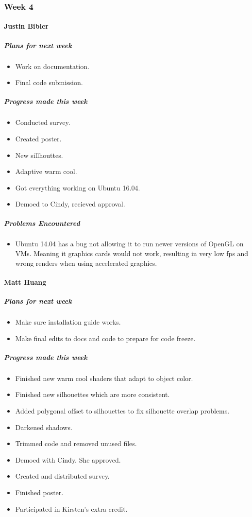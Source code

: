 {
\subsubsection{Week 4}
\paragraph{Justin Bibler}
\subparagraph{Plans for next week}
\begin{itemize}
  \item Work on documentation.
  \item Final code submission.
\end{itemize}

\subparagraph{Progress made this week}
\begin{itemize}
  \item Conducted survey.
  \item Created poster.
  \item New sillhouttes.
  \item Adaptive warm cool.
  \item Got everything working on Ubuntu 16.04.
  \item Demoed to Cindy, recieved approval.
\end{itemize}

\subparagraph{Problems Encountered}
\begin{itemize}
  \item Ubuntu 14.04 has a bug not allowing it to run newer versions of OpenGL on VMs. Meaning it graphics cards would not work, resulting in very low fps and wrong renders when using accelerated graphics.
\end{itemize}
\vspace{3mm}

\paragraph{Matt Huang}
\subparagraph{Plans for next week}
\begin{itemize}
  \item Make sure installation guide works.
  \item Make final edits to docs and code to prepare for code freeze.
\end{itemize}

\subparagraph{Progress made this week}
\begin{itemize}
  \item Finished new warm cool shaders that adapt to object color.
  \item Finished new silhouettes which are more consistent.
  \item Added polygonal offset to silhouettes to fix silhouette overlap problems.
  \item Darkened shadows.
  \item Trimmed code and removed unused files.
  \item Demoed with Cindy. She approved.
  \item Created and distributed survey.
  \item Finished poster.
  \item Participated in Kirsten's extra credit.
\end{itemize}

}
